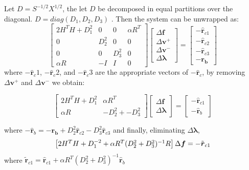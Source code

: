 \documentclass[12pt,a4paper,twoside]{report}
\begin{document}
Let $D = S^{-1/2}X^{1/2}$, the let $D$ be decomposed in equal partitions over the diagonal. $D = diag(D_1, D_2, D_3)$ .
Then the system can be unwrapped as:
\begin{equation}
\begin{bmatrix}
2H^TH+D_1^{2} & 0 & 0 &\alpha R ^T\\
0 & D_2^{2} & 0 & 0 \\
 0 & 0 &  D_3^{2} & 0\\
\alpha R &-I & I & 0  
\end{bmatrix} 
\begin{bmatrix}
\Delta\boldsymbol{f} \\ 
\Delta\boldsymbol{v}^+ \\ 
\Delta\boldsymbol{v}^- \\ 
\Delta\boldsymbol{\lambda} 
\end{bmatrix} =
\begin{bmatrix}
-\hat{\boldsymbol{r}}_{c1} \\
-\hat{\boldsymbol{r}}_{c2} \\
-\hat{\boldsymbol{r}}_{c3} \\
 \boldsymbol{-r_b} 
\end{bmatrix}
\end{equation}
where $-\hat{\boldsymbol{r}}_c1$, $-\hat{\boldsymbol{r}}_c2$,  and $-\hat{\boldsymbol{r}}_c3$ are the appropriate vectors of $-\hat{\boldsymbol{r}}_c$, 
by removing $\Delta \boldsymbol{v}^+$ and $\Delta \boldsymbol{v}^-$ we obtain:

\begin{equation}
\begin{bmatrix}
2H^TH+D_1^{2} &\alpha R ^T\\
 \alpha R & -D_2^{2} + -D_3^{2} 
\end{bmatrix} 
\begin{bmatrix}
\Delta\boldsymbol{f} \\ 
\Delta\boldsymbol{\lambda} 
\end{bmatrix} =
\begin{bmatrix}
-\hat{\boldsymbol{r}}_{c1} \\
-\hat{\boldsymbol{r}}_b  
\end{bmatrix}
\end{equation}

 where 
 $-\hat{\boldsymbol{r}}_b =  \boldsymbol{-r_b} + D^2_2\hat{\boldsymbol{r}}_{c2} - D^2_3\hat{\boldsymbol{r}}_{c3}$
 and finally, eliminating $\Delta\boldsymbol{\lambda}$,
 \begin{equation} \label{lmnXeq}
 \begin{bmatrix}
 2H^TH+D_1^{-2} + \alpha R ^T( D_2^{2} +  D_3^{2} )^{-1}R
 \end{bmatrix} 
 \Delta\boldsymbol{f}  =
 -\tilde{\boldsymbol{r}}_{c1} \\
 \end{equation}
 where $\tilde{\boldsymbol{r}}_{c1} = \hat{\boldsymbol{r}}_{c1} + \alpha R ^T( D_2^{2} +  D_3^{2} )^{-1} \hat{\boldsymbol{r}}_{b}$
 
\end{document}
